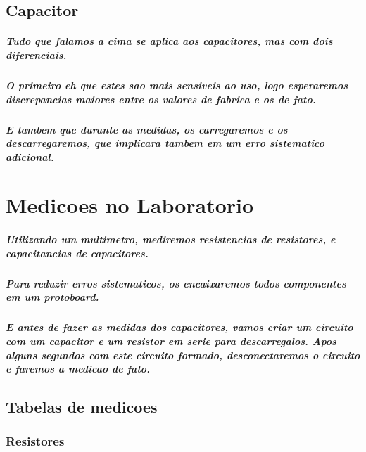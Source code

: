 \documentclass[12pt,twoside, a4paper, twocolumn]{article}
\begin{document}
\subsection{Capacitor}

\subparagraph*{Tudo que falamos a cima se aplica aos capacitores, mas com dois diferenciais.}

\subparagraph*{O primeiro eh que estes sao mais sensiveis ao uso, logo esperaremos discrepancias maiores entre os valores de fabrica e os de fato.}

\subparagraph*{E tambem que durante as medidas, os carregaremos e os descarregaremos, que implicara tambem em um erro sistematico adicional.}


\section{Medicoes no Laboratorio}

\subparagraph*{Utilizando um multimetro, mediremos resistencias de resistores, e capacitancias de capacitores.}

\subparagraph*{Para reduzir erros sistematicos, os encaixaremos todos componentes em um protoboard.}

\subparagraph*{E antes de fazer as medidas dos capacitores, vamos criar um circuito com um capacitor e um resistor em serie para descarregalos. Apos alguns segundos com este circuito formado, desconectaremos o circuito e faremos a medicao de fato.}

\subsection{Tabelas de medicoes}

\subsubsection{Resistores}
\end{document}

